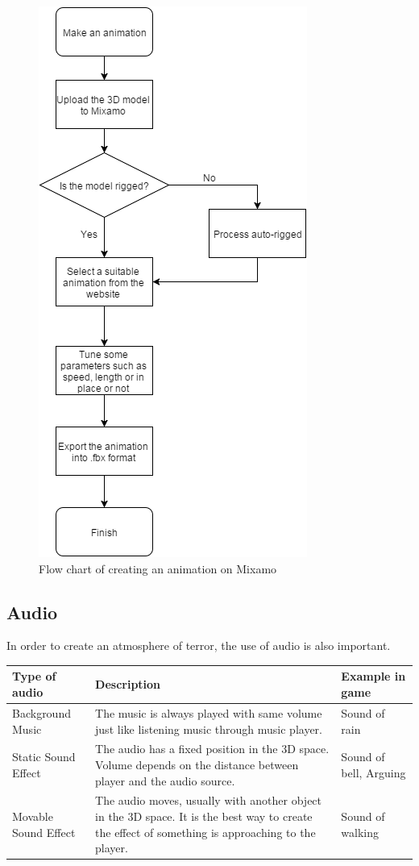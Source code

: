\documentclass{article}
\begin{document}
\begin{figure}[h]
\centering
\includegraphics[scale=0.6]{animation1.png}
\caption{Flow chart of creating an animation on Mixamo}
\label{fig:animation1}
\end{figure}

\clearpage
\subsection{Audio}
In order to create an atmosphere of terror, the use of audio is also important.
\bigskip

\begin{tabular}{ | p{3cm} | p{9cm} | p{3cm} | }
 \hline
 \textbf{Type of audio} & \textbf{Description} & \textbf{Example in game} \\
 \hline
 Background Music & The music is always played with same volume just like listening music through music player. & Sound of rain \\
 \hline
 Static Sound Effect & The audio has a fixed position in the 3D space. Volume depends on the distance between player and the audio source. & Sound of bell, Arguing \\
 \hline
 Movable Sound Effect & The audio moves, usually with another object in the 3D space. It is the best way to create the effect of something is approaching to the player. & Sound of walking \\
 \hline
\end{tabular}
\bigskip
\end{document}
